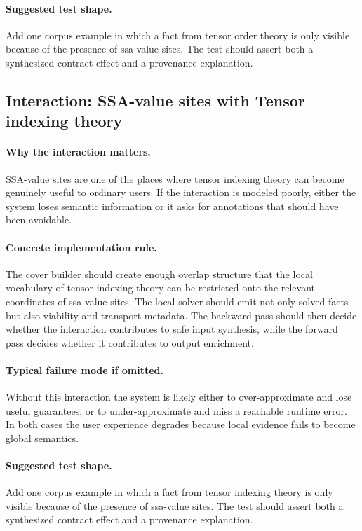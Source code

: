 \documentclass[11pt]{report}
\theoremstyle{definition}
\theoremstyle{plain}
\begin{document}
\paragraph{Suggested test shape.}
Add one corpus example in which a fact from tensor order theory is only
visible because of the presence of ssa-value sites. The test should
assert both a synthesized contract effect and a provenance explanation.

\subsection{Interaction: SSA-value sites with Tensor indexing theory}

\paragraph{Why the interaction matters.}
SSA-value sites are one of the places where tensor indexing theory can become
genuinely useful to ordinary users. If the interaction is modeled poorly,
either the system loses semantic information or it asks for annotations that
should have been avoidable.

\paragraph{Concrete implementation rule.}
The cover builder should create enough overlap structure that the local
vocabulary of tensor indexing theory can be restricted onto the relevant
coordinates of ssa-value sites. The local solver should emit not only
solved facts but also viability and transport metadata. The backward pass
should then decide whether the interaction contributes to safe input
synthesis, while the forward pass decides whether it contributes to output
enrichment.

\paragraph{Typical failure mode if omitted.}
Without this interaction the system is likely either to over-approximate and
lose useful guarantees, or to under-approximate and miss a reachable runtime
error. In both cases the user experience degrades because local evidence
fails to become global semantics.

\paragraph{Suggested test shape.}
Add one corpus example in which a fact from tensor indexing theory is only
visible because of the presence of ssa-value sites. The test should
assert both a synthesized contract effect and a provenance explanation.
\end{document}
